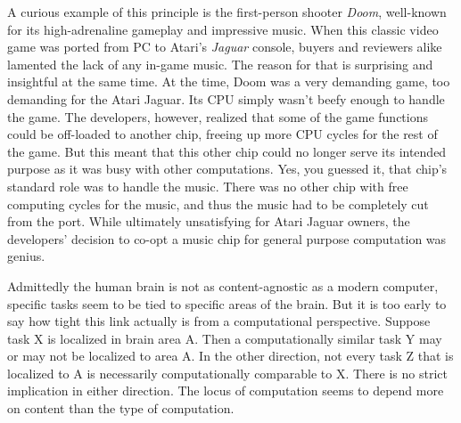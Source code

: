 A curious example of this principle is the first-person shooter \emph{Doom}, well-known for its high-adrenaline gameplay and impressive music.
When this classic video game was ported from PC to Atari's \emph{Jaguar} console, buyers and reviewers alike lamented the lack of any in-game music.
The reason for that is surprising and insightful at the same time.
At the time, Doom was a very demanding game, too demanding for the Atari Jaguar.
Its CPU simply wasn't beefy enough to handle the game.
The developers, however, realized that some of the game functions could be off-loaded to another chip, freeing up more CPU cycles for the rest of the game.
But this meant that this other chip could no longer serve its intended purpose as it was busy with other computations.
Yes, you guessed it, that chip's standard role was to handle the music. 
There was no other chip with free computing cycles for the music, and thus the music had to be completely cut from the port.
While ultimately unsatisfying for Atari Jaguar owners, the developers' decision to co-opt a music chip for general purpose computation was genius.

Admittedly the human brain is not as content-agnostic as a modern computer, specific tasks seem to be tied to specific areas of the brain.
But it is too early to say how tight this link actually is from a computational perspective.
Suppose task X is localized in brain area A\@.
Then a computationally similar task Y may or may not be localized to area A\@.
In the other direction, not every task Z that is localized to A is necessarily computationally comparable to X\@.
There is no strict implication in either direction.
The locus of computation seems to depend more on content than the type of computation.

